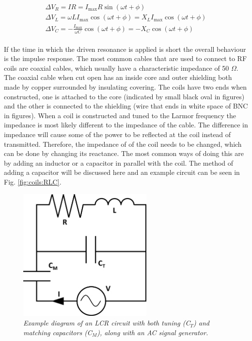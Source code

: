 \begin{equation}
\begin{gathered}
    \Delta V_R = IR = I_{\mathrm{max}}R\sin(\omega t + \phi) \\
    \Delta V_L = \omega LI_{\mathrm{max}}\cos(\omega t + \phi) =  X_LI_{\mathrm{max}}\cos(\omega t + \phi)\\
    \Delta V_C = -\frac{I_{\mathrm{max}}}{\omega C}\cos(\omega t + \phi) = -X_C\cos(\omega t + \phi)\\
    \label{eqn:coils:Voltage}
\end{gathered}
\end{equation}

If the time in which the driven resonance is applied is short the overall behaviour is the impulse response. The most common cables that are used to connect to \ac{RF} coils are coaxial cables, which usually have a characteristic impedance of 50 $\Omega$. The coaxial cable when cut open has an inside core and outer shielding both made by copper surrounded by insulating covering. The coils have two ends when constructed, one is attached to the core (indicated by small black oval in figures) and the other is connected to the shielding (wire that ends in white space of BNC in figures). When a coil is constructed and tuned to the Larmor frequency the impedance is most likely different to the impedance of the cable. The difference in impedance will cause some of the power to be reflected at the coil instead of transmitted. Therefore, the impedance of of the coil needs to be changed, which can be done by changing its reactance. The most common ways of doing this are by adding an inductor or a capacitor in parallel with the coil. The method of adding a capacitor will be discussed here and an example circuit can be seen in Fig. \ref{fig:coils:RLC}.

\begin{figure}
    \centering
    \includegraphics[width=0.6\textwidth]{Figures/Coils/RLC_Circuit_Match.png}
    \caption{\textit{Example diagram of an LCR circuit with both tuning (C$_T$) and matching capacitors (C$_M$), along with an AC signal generator.}}
    \label{fig:coils:RLC_match}
\end{figure}

